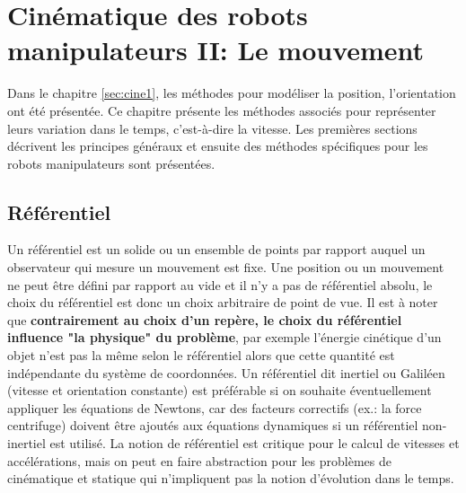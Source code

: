 \chapter{Cinématique des robots manipulateurs II: Le mouvement}
\label{sec:cinediff}



Dans le chapitre \ref{sec:cine1}, les méthodes pour modéliser la position, l'orientation ont été présentée. Ce chapitre présente les méthodes associés pour représenter leurs variation dans le temps, c'est-à-dire la vitesse. Les premières sections décrivent les principes généraux et ensuite des méthodes spécifiques pour les robots manipulateurs sont présentées. 



\section{Référentiel} 

Un référentiel est un solide ou un ensemble de points par rapport auquel un observateur qui mesure un mouvement est fixe. Une position ou un mouvement ne peut être défini par rapport au vide et il n'y a pas de référentiel absolu, le choix du référentiel est donc un choix arbitraire de point de vue. Il est à noter que \textbf{contrairement au choix d'un repère, le choix du référentiel influence "la physique" du problème}, par exemple l'énergie cinétique d'un objet n'est pas la même selon le référentiel alors que cette quantité est indépendante du système de coordonnées. Un référentiel dit inertiel ou Galiléen (vitesse et orientation constante) est préférable si on souhaite éventuellement appliquer les équations de Newtons, car des facteurs correctifs (ex.: la force centrifuge) doivent être ajoutés aux équations dynamiques si un référentiel non-inertiel est utilisé. La notion de référentiel est critique pour le calcul de vitesses et accélérations, mais on peut en faire abstraction pour les problèmes de cinématique et statique qui n'impliquent pas la notion d'évolution dans le temps. 


